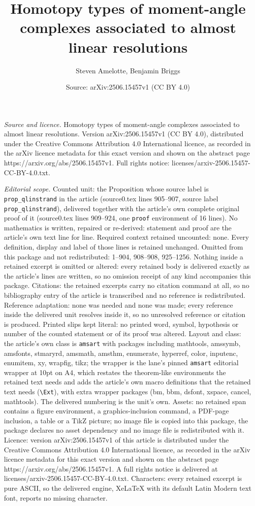 \documentclass[10pt,a4paper]{amsart}
\title[Homotopy types of moment-angle complexes associated to almos]{Homotopy types of moment-angle complexes associated to almost linear resolutions}
\author{Steven Amelotte, Benjamin Briggs}
\date{Source: arXiv:2506.15457v1 (CC BY 4.0)}
\begin{document}
\maketitle

\noindent\emph{Source and licence.} Homotopy types of moment-angle complexes associated to almost linear resolutions. Version arXiv:2506.15457v1 (CC BY 4.0), distributed under the Creative Commons Attribution 4.0 International licence, as recorded in the arXiv licence metadata for this exact version and shown on the abstract page https://arxiv.org/abs/2506.15457v1. Full rights notice: licenses/arxiv-2506.15457-CC-BY-4.0.txt.\par\smallskip

\noindent\textit{Editorial scope.} Counted unit: the Proposition whose source label is \texttt{prop\_qlinstrand} in the article (source0.tex lines 905--907, source label \texttt{prop\_qlinstrand}), delivered together with the article's own complete original proof of it (source0.tex lines 909--924, one \texttt{proof} environment of 16 lines). No mathematics is written, repaired or re-derived: statement and proof are the article's own text line for line. Required context retained uncounted: none. Every definition, display and label of those lines is retained unchanged. Omitted from this package and not redistributed: 1--904, 908--908, 925--1256. Nothing inside a retained excerpt is omitted or altered: every retained body is delivered exactly as the article's lines are written, so no omission receipt of any kind accompanies this package. Citations: the retained excerpts carry no citation command at all, so no bibliography entry of the article is transcribed and no reference is redistributed. Reference adaptation: none was needed and none was made; every reference inside the delivered unit resolves inside it, so no unresolved reference or citation is produced. Printed slips kept literal: no printed word, symbol, hypothesis or number of the counted statement or of its proof was altered. Layout and class: the article's own class is \texttt{amsart} with packages including mathtools, amssymb, amsfonts, stmaryrd, amsmath, amsthm, enumerate, hyperref, color, inputenc, enumitem, xy, wrapfig, tikz; the wrapper is the lane's pinned \texttt{amsart} editorial wrapper at 10pt on A4, which restates the theorem-like environments the retained text needs and adds the article's own macro definitions that the retained text needs (\texttt{\textbackslash Ext}), with extra wrapper packages (bm, bbm, dsfont, xspace, cancel, mathtools). The delivered numbering is the unit's own. Assets: no retained span contains a figure environment, a graphics-inclusion command, a PDF-page inclusion, a table or a TikZ picture; no image file is copied into this package, the package declares no asset dependency and no image file is redistributed with it. Licence: version arXiv:2506.15457v1 of this article is distributed under the Creative Commons Attribution 4.0 International licence, as recorded in the arXiv licence metadata for this exact version and shown on the abstract page https://arxiv.org/abs/2506.15457v1. A full rights notice is delivered at licenses/arxiv-2506.15457-CC-BY-4.0.txt. Characters: every retained excerpt is pure ASCII, so the delivered engine, XeLaTeX with its default Latin Modern text font, reports no missing character.
\end{document}
